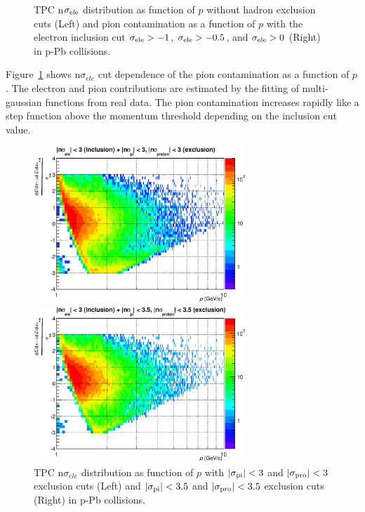 {\begin{figure}[!h]
\begin{minipage}{0.5\hsize}
\begin{center}
    \end{center}
 \end{minipage}
  \caption{TPC n$\sigma_{\rm{ele}}$ distribution as function of $p$ without hadron exclusion cuts (Left)  and 
	  pion contamination as a function of $p$ with the electron inclusion cut $\sigma_{\rm{ele}}>-1$, $\sigma_{\rm{ele}}>-0.5$, and $\sigma_{\rm{ele}}>0$  (Right) in p-Pb collisions.	
   }
  \label{fig_4_tpcinclusion}
\end{figure}
Figure~\ref{fig_4_tpcinclusion} shows n$\sigma_{ele}$ cut dependence of the pion contamination as a function of $p$. 
The electron and pion contributions are estimated by the fitting of multi-gaussian functions from real data. 
The pion contamination increases rapidly like a step function above the momentum threshold depending on the inclusion cut value.
\begin{figure}[htbp]
 \begin{minipage}{0.5\hsize}
  \begin{center}
  \includegraphics[width=8cm]{chap4/figure/PID/TPCNsigmaElevsp_Selected_ex3.eps}
  \end{center}
 \end{minipage}
 \begin{minipage}{0.5\hsize}
  \begin{center}
  \includegraphics[width=8cm]{chap4/figure/PID/TPCNsigmaElevsp_Selected_ex3p5.eps}
  \end{center}
 \end{minipage}
  \caption{TPC n$\sigma_{ele}$ distribution as function of $p$ with $|\sigma_{\rm{pi}}|<3$ and $|\sigma_{\rm{pro}}|<3$ exclusion cuts (Left) and $|\sigma_{\rm{pi}}|<3.5$ and $|\sigma_{\rm{pro}}|<3.5$ exclusion cuts (Right) in p-Pb collisions.}
  \label{fig_4_tpcnsigmawex}
\end{figure}

}
